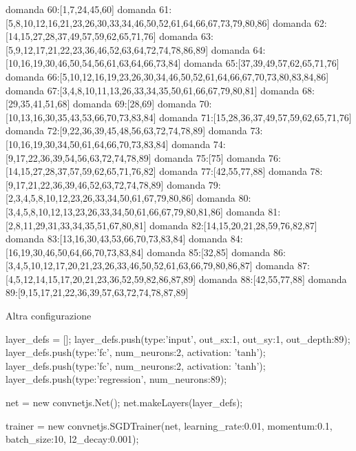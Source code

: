 domanda 60:[1,7,24,45,60]
domanda 61:[5,8,10,12,16,21,23,26,30,33,34,46,50,52,61,64,66,67,73,79,80,86]
domanda 62:[14,15,27,28,37,49,57,59,62,65,71,76]
domanda 63:[5,9,12,17,21,22,23,36,46,52,63,64,72,74,78,86,89]
domanda 64:[10,16,19,30,46,50,54,56,61,63,64,66,73,84]
domanda 65:[37,39,49,57,62,65,71,76]
domanda 66:[5,10,12,16,19,23,26,30,34,46,50,52,61,64,66,67,70,73,80,83,84,86]
domanda 67:[3,4,8,10,11,13,26,33,34,35,50,61,66,67,79,80,81]
domanda 68:[29,35,41,51,68]
domanda 69:[28,69]
domanda 70:[10,13,16,30,35,43,53,66,70,73,83,84]
domanda 71:[15,28,36,37,49,57,59,62,65,71,76]
domanda 72:[9,22,36,39,45,48,56,63,72,74,78,89]
domanda 73:[10,16,19,30,34,50,61,64,66,70,73,83,84]
domanda 74:[9,17,22,36,39,54,56,63,72,74,78,89]
domanda 75:[75]
domanda 76:[14,15,27,28,37,57,59,62,65,71,76,82]
domanda 77:[42,55,77,88]
domanda 78:[9,17,21,22,36,39,46,52,63,72,74,78,89]
domanda 79:[2,3,4,5,8,10,12,23,26,33,34,50,61,67,79,80,86]
domanda 80:[3,4,5,8,10,12,13,23,26,33,34,50,61,66,67,79,80,81,86]
domanda 81:[2,8,11,29,31,33,34,35,51,67,80,81]
domanda 82:[14,15,20,21,28,59,76,82,87]
domanda 83:[13,16,30,43,53,66,70,73,83,84]
domanda 84:[16,19,30,46,50,64,66,70,73,83,84]
domanda 85:[32,85]
domanda 86:[3,4,5,10,12,17,20,21,23,26,33,46,50,52,61,63,66,79,80,86,87]
domanda 87:[4,5,12,14,15,17,20,21,23,36,52,59,82,86,87,89]
domanda 88:[42,55,77,88]
domanda 89:[9,15,17,21,22,36,39,57,63,72,74,78,87,89]







Altra configurazione

layer_defs = [];
layer_defs.push({type:'input', out_sx:1, out_sy:1, out_depth:89});
layer_defs.push({type:'fc', num_neurons:2, activation: 'tanh'});
layer_defs.push({type:'fc', num_neurons:2, activation: 'tanh'});
layer_defs.push({type:'regression', num_neurons:89});

net = new convnetjs.Net();
net.makeLayers(layer_defs);

trainer = new convnetjs.SGDTrainer(net, {learning_rate:0.01, momentum:0.1, batch_size:10, l2_decay:0.001});

